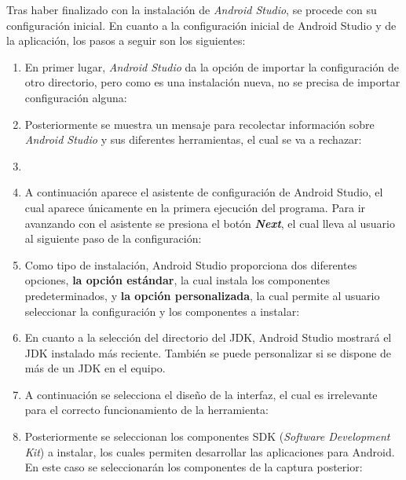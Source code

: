     Tras haber finalizado con la instalación de \textit{Android Studio}, se procede con su configuración inicial.
    En cuanto a la configuración inicial de Android Studio y de la aplicación, los pasos a seguir son los siguientes:
    \begin{enumerate}
        \item En primer lugar, \textit{Android Studio} da la opción de importar la configuración de otro directorio, pero como es una instalación nueva, no se precisa de importar configuración alguna:
        \item Posteriormente se muestra un mensaje para recolectar información sobre \textit{Android Studio} y sus diferentes herramientas, el cual se va a rechazar:
        \item {}
        \item A continuación aparece el asistente de configuración de Android
        Studio, el cual aparece únicamente en la primera ejecución del programa.
        Para ir avanzando con el asistente se presiona el botón
        \textbf{\textit{Next}}, el cual lleva al usuario al siguiente paso de la
        configuración:
        \item Como tipo de instalación, Android Studio proporciona dos
        diferentes opciones, \textbf{la opción estándar}, la cual instala los
        componentes predeterminados, y \textbf{la opción personalizada}, la cual
        permite al usuario seleccionar la configuración y los componentes a
        instalar:
        \item En cuanto a la selección del directorio del JDK, Android Studio mostrará el JDK instalado más reciente. También se puede personalizar si se dispone de más de un JDK en el equipo.
        \item A continuación se selecciona el diseño de la interfaz, el cual es irrelevante para el correcto funcionamiento de la herramienta:
        \item Posteriormente se seleccionan los componentes SDK (\textit{Software Development Kit}) a instalar, los cuales permiten desarrollar las aplicaciones para Android. En este caso se seleccionarán los componentes de la captura posterior:

\end{enumerate}
